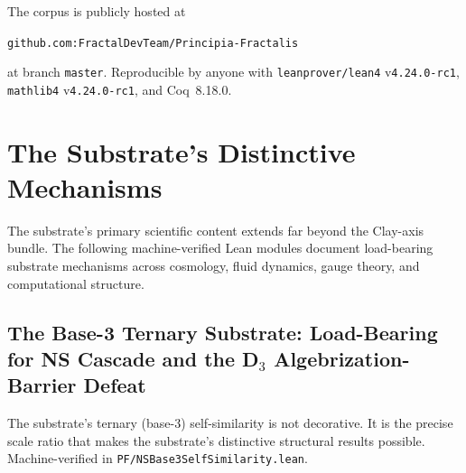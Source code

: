 \documentclass[11pt,a4paper]{amsart}
\theoremstyle{plain}
\theoremstyle{definition}
\begin{document}
The corpus is publicly hosted at
\begin{center}
\texttt{github.com:FractalDevTeam/Principia-Fractalis}
\end{center}
at branch \texttt{master}. Reproducible by anyone with \texttt{leanprover/lean4} v\texttt{4.24.0-rc1}, \texttt{mathlib4} v\texttt{4.24.0-rc1}, and Coq~8.18.0.

\section{The Substrate's Distinctive Mechanisms}\label{sec:distinctive-mechanisms}

The substrate's primary scientific content extends far beyond the Clay-axis bundle. The following machine-verified Lean modules document load-bearing substrate mechanisms across cosmology, fluid dynamics, gauge theory, and computational structure.

\subsection{The Base-3 Ternary Substrate: Load-Bearing for NS Cascade and the D\texorpdfstring{$_3$}{3} Algebrization-Barrier Defeat}\label{subsec:base3-ternary}

The substrate's ternary (base-3) self-similarity is not decorative. It is the precise scale ratio that makes the substrate's distinctive structural results possible. Machine-verified in \texttt{PF/NSBase3SelfSimilarity.lean}.
\end{document}
